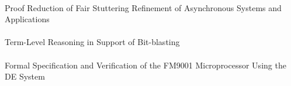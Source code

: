 \documentclass{article}
\begin{document}
\cite{17-sumners-refinement} \\
Proof Reduction of Fair Stuttering Refinement of Asynchronous Systems and Applications \\

\cite{17-swords-blasting} \\
Term-Level Reasoning in Support of Bit-blasting \\

\cite{17-chau-de} \\
Formal Specification and Verification of the {FM9001} Microprocessor Using the {DE} System \\




\end{document}
